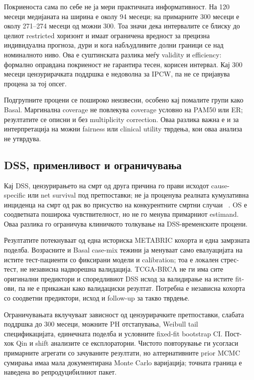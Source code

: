 \documentclass[12pt]{article}
\begin{document}
Покриеноста сама по себе не ја мери практичната информативност. На 120 месеци
медијаната на ширина е околу 94 месеци; на примарните 300 месеци е околу
271--274 месеци од можни 300. Тоа значи дека интервалите се блиску до целиот
restricted хоризонт и имаат ограничена вредност за прецизна индивидуална
прогноза, дури и кога набљудливите долни граници се над номиналното ниво.
Ова е суштинската разлика меѓу validity и efficiency: формално оправдана
покриеност не гарантира тесен, корисен интервал. Кај 300 месеци цензурирачката
поддршка е недоволна за IPCW, па не се пријавува процена за тој опсег.

Подгрупните процени се пошироко неизвесни, особено кај помалите групи како
Basal. Маргинална coverage не повлекува coverage условно на PAM50 или ER;
резултатите се описни и без multiplicity correction. Оваа разлика важна е и
за интерпретација на можни fairness или clinical utility тврдења, кои оваа
анализа не утврдува.

\subsection{DSS, применливост и ограничувања}

Кај DSS, цензурирањето на смрт од друга причина го прави исходот cause-specific
или net survival под претпоставки; не ја проценува реалната кумулативна
инциденца на смрт од рак во присуство на конкурентните смртни случаи
~\cite{putter2007,austin2016}. OS е соодветната поширока чувствителност, но не
го менува примарниот estimand. Оваа разлика го ограничува клиничкото толкување
на DSS-временските процени.

Резултатите потекнуваат од една историска METABRIC кохорта и една замрзната
поделба. Возрасните и Basal case-mix тежини ја менуваат само евалуацијата на
истите тест-пациенти со фиксирани модели и calibration; тоа е локален стрес-тест,
не независна надворешна валидација. TCGA-BRCA не ги има сите оригинални
предиктори и споредливиот DSS исход за валидирање на истите fit-ови, па не е
прикажан како валидациски резултат. Потребна е независна кохорта со соодветни
предиктори, исход и follow-up за такво тврдење.

Ограничувањата вклучуваат зависност од цензурирачките претпоставки, слабата
поддршка до 300 месеци, можните PH отстапувања, Weibull tail спецификацијата,
единечната поделба и условните fixed-fit bootstrap CI. Пост-хок Qin и shift
анализите се експлораторни. Чистото повторување ги усогласи примарните
агрегати со зачуваните резултати, но алтернативните prior MCMC сумирања имаа
мала документирана Monte Carlo варијација; точната граница е наведена во
репродуцибилниот пакет.
\end{document}
